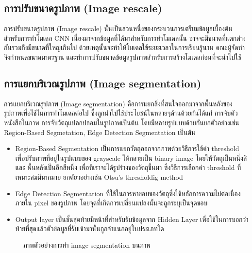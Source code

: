 \documentclass[12pt,oneside,openright,a4paper]{cpe-thai-project}
\begin{document}
\subsection{การปรับขนาดรูปภาพ (Image rescale)\cite{Imagepre}}
การปรับขนาดรูปภาพ (Image rescale) นั้นเป็นส่วนหนึ่งของกระบวนการเตรียมข้อมูลเบื้องต้นสำหรับการทำโมเดล CNN 
เนื่องมาจากข้อมูลที่ได้มาสำหรับการทำโมเดลนั้น อาจจะมีขนาดที่แตกต่างกันรวมถึงมีขนาดที่ใหญ่เกินไป ด้วยเหตุนั้นจะทำให้โมเดลใช้ระยะเวลาในการเรียนรู้นาน 
คณะผู้จัดทำจึงกำหนดขนาดมาตรฐาน และทำการปรับขนาดข้อมูลรูปภาพสำหรับการสร้างโมเดลก่อนที่จะนำไปใช้

\newpage
\subsection{การแยกบริเวณรูปภาพ (Image segmentation)\cite{Imagesegment}}
การแยกบริเวณรูปภาพ (Image segmentation) คือการแยกสิ่งที่สนใจออกมาจากพื้นหลังของรูปภาพเพื่อใช้ในการทำโมเดลต่อไป ซึ่งถูกนำไปใช้ประโยชน์ในหลายๆด้านด้วยกันได้แก่ 
การจับตัวหนังสือในภาพ การจับวัตถุแปลกปลอมในรูปภาพเป็นต้น โดยมีหลายรูปแบบด้วยกันยกตัวอย่างเช่น Region-Based Segmetation, Edge Detection Segmentation เป็นต้น
\begin{itemize}
  \item Region-Based Segmentation เป็นการแยกวัตถุออกจากภาพด้วยวิธีการใช้ค่า threshold เพื่อปรับภาพที่อยู่ในรูปแบบของ grayscale ให้กลายเป็น binary image โดยให้วัตถุเป็นหนึ่งสี และ พื้นหลังเป็นอีกสีหนึ่ง เพื่อที่เราจะได้รูปร่างของวัตถุขึ้นมา ซึ่งวิธีการเลือกค่า threshold ที่เหมาะสมมีมากมาย ยกตัยวอย่างเช่น Otsu’s thresholdig method

  \item Edge Detection Segmentation ที่ใช้ในการหาขอบของวัตถุซึ่งใช้หลักการความไม่ต่อเนื่องภายใน pixel ของรูปภาพ โดยจุดที่เกิดการเปลี่ยนแปลงนั้นจะถูกระบุเป็นจุดขอบ 
  \item Output layer เป็นชั้นสุดท้ายมีหน้าที่สำหรับรับข้อมูลจาก Hidden Layer เพื่อใช้ในการบอกว่าท้ายที่สุดแล้วตัวข้อมูลที่รับเข้ามานั้นถูกจำแนกอยู่ในประเภทใด
\end{itemize}
\begin{figure}[!ht]\centering
  \setlength{\fboxrule}{0.2mm} %
  \setlength{\fboxsep}{1cm}
  \caption{ภาพตัวอย่างการทำ image segmentation บนภาพ}\label{fig:imagesegment}
\end{figure}
\end{document}
